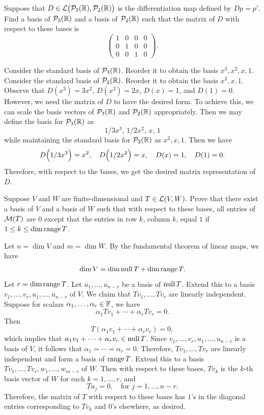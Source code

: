 \begin{exercise}
Suppose that $D\in\mathcal{L}\bigl(\mathcal{P}_3(\mathbb{R}),\mathcal{P}_2(\mathbb{R})\bigr)$ is the
differentiation map defined by $Dp=p'$. Find a basis of $\mathcal{P}_3(\mathbb{R})$ and a
basis of $\mathcal{P}_2(\mathbb{R})$ such that the matrix of $D$ with respect to these bases
is
\[ \begin{pmatrix} 1 & 0 & 0 & 0\\ 0 & 1 & 0 & 0\\ 0 & 0 & 1 & 0
   \end{pmatrix}. \]
\end{exercise}
\begin{solution}
Consider the standard basis of $\mathcal{P}_3(\mathbb{R})$. Reorder it to obtain the basis
$x^3,x^2,x,1$. Consider the standard basis of $\mathcal{P}_2(\mathbb{R})$. Reorder it to
obtain the basis $x^2,x,1$. Observe that $D(x^3)=3x^2$, $D(x^2)=2x$, $D(x)=1$,
and $D(1)=0$. However, we need the matrix of $D$ to have the desired form. To
achieve this, we can scale the basis vectors of $\mathcal{P}_3(\mathbb{R})$ and $\mathcal{P}_2(\mathbb{R})$
appropriately. Then we may define the basis for $\mathcal{P}_3(\mathbb{R})$ as
\[ 1/3x^3,\,1/2x^2,\,x,\,1 \]
while maintaining the standard basis for $\mathcal{P}_2(\mathbb{R})$ as $x^2,x,1$. Then we
have
\[ D\Bigl(1/3x^3\Bigr)=x^2, \quad D\Bigl(1/2x^2\Bigr)=x, \quad
   D(x)=1, \quad D(1)=0. \]
Therefore, with respect to the bases, we get the desired matrix representation
of $D$.
\end{solution}

\begin{exercise}
Suppose $V$ and $W$ are finite-dimensional and $T\in\mathcal{L}(V,W)$. Prove that
there exist a basis of $V$ and a basis of $W$ such that with respect to these
bases, all entries of $\mathcal{M}(T)$ are $0$ except that the entries in row $k$,
column $k$, equal $1$ if $1\le k\le\operatorname{dim}\operatorname{range} T$.
\end{exercise}
\begin{solution}
Let $n=\dim V$ and $m=\dim W$. By the fundamental theorem of linear maps, we
have
\[ \operatorname{dim} V = \operatorname{dim}\operatorname{null} T+\operatorname{dim}\operatorname{range} T. \]
Let $r=\operatorname{dim}\operatorname{range} T$. Let $u_1,\dots,u_{n-r}$ be a basis of $\operatorname{null} T$. Extend
this to a basis $v_1,\dots,v_r,u_1,\dots,u_{n-r}$ of $V$. We claim that
$Tv_1,\dots,Tv_r$ are linearly independent. Suppose for scalars
$\alpha_1,\dots,\alpha_r\in\mathbb{F}$, we have
\[ \alpha_1Tv_1+\cdots+\alpha_rTv_r = 0. \]
Then
\[ T(\alpha_1v_1+\cdots+\alpha_rv_r) = 0, \]
which implies that $\alpha_1v_1+\cdots+\alpha_rv_r\in\operatorname{null} T$. Since
$v_1,\dots,v_r,u_1,\dots,u_{n-r}$ is a basis of $V$, it follows that
$\alpha_1=\cdots=\alpha_r=0$. Therefore, $Tv_1,\dots,Tv_r$ are linearly
independent and form a basis of $\operatorname{range} T$. Extend this to a basis
$Tv_1,\dots,Tv_r,w_1,\dots,w_{m-r}$ of $W$. Then with respect to these bases,
$Tv_k$ is the $k$-th basis vector of $W$ for each $k=1,\dots,r$, and
\[ Tu_j = 0, \quad\text{for } j=1,\dots,n-r. \]
Therefore, the matrix of $T$ with respect to these bases has $1$'s in the
diagonal entries corresponding to $Tv_k$ and $0$'s elsewhere, as desired.
\end{solution}

